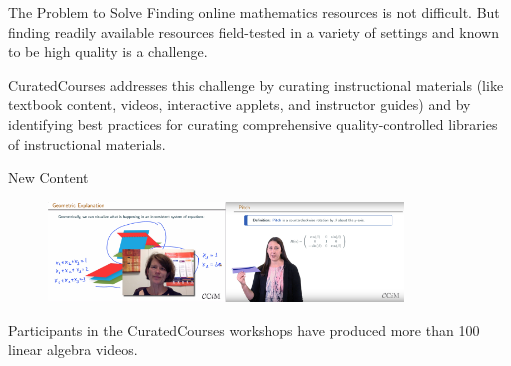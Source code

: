 \begin{sectionblock}{The Problem to Solve}
  Finding online mathematics resources is not difficult.
  But finding readily available resources field-tested in a variety of
  settings and known to be high quality is a challenge.

  \vspace{1ex}CuratedCourses addresses this challenge by curating
  instructional materials (like textbook content, videos, interactive
  applets, and instructor guides) and by identifying best practices
  for curating comprehensive quality-controlled libraries of
  instructional materials.
  
\end{sectionblock}

\vspace{3ex}

\begin{sectionblock}{New Content}
  
\vspace{-1ex}\begin{figure}\null\hfill\includegraphics[width=0.42\textwidth]{petra.png}\hfill\includegraphics[width=0.42\textwidth]{sarah.png}\hfill\null\end{figure}
Participants in the CuratedCourses workshops have produced more than
100 linear algebra videos.
  
\end{sectionblock}





